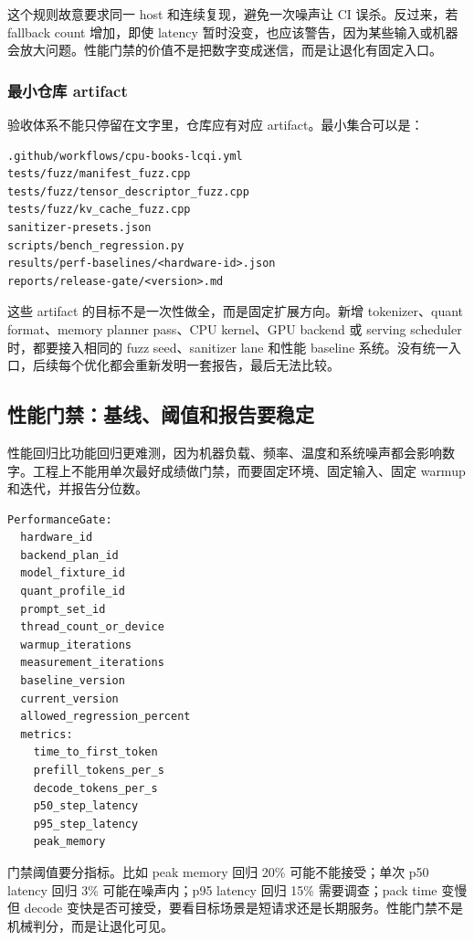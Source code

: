 这个规则故意要求同一 host 和连续复现，避免一次噪声让 CI 误杀。反过来，若 fallback count 增加，即使 latency 暂时没变，也应该警告，因为某些输入或机器会放大问题。性能门禁的价值不是把数字变成迷信，而是让退化有固定入口。

\subsubsection{最小仓库 artifact}

验收体系不能只停留在文字里，仓库应有对应 artifact。最小集合可以是：

\begin{lstlisting}[numbers=none,caption={验收体系最小 artifact}]
.github/workflows/cpu-books-lcqi.yml
tests/fuzz/manifest_fuzz.cpp
tests/fuzz/tensor_descriptor_fuzz.cpp
tests/fuzz/kv_cache_fuzz.cpp
sanitizer-presets.json
scripts/bench_regression.py
results/perf-baselines/<hardware-id>.json
reports/release-gate/<version>.md
\end{lstlisting}

这些 artifact 的目标不是一次性做全，而是固定扩展方向。新增 tokenizer、quant format、memory planner pass、CPU kernel、GPU backend 或 serving scheduler 时，都要接入相同的 fuzz seed、sanitizer lane 和性能 baseline 系统。没有统一入口，后续每个优化都会重新发明一套报告，最后无法比较。

\subsection{性能门禁：基线、阈值和报告要稳定}

性能回归比功能回归更难测，因为机器负载、频率、温度和系统噪声都会影响数字。工程上不能用单次最好成绩做门禁，而要固定环境、固定输入、固定 warmup 和迭代，并报告分位数。

\begin{lstlisting}[numbers=none,caption={性能门禁报告字段}]
PerformanceGate:
  hardware_id
  backend_plan_id
  model_fixture_id
  quant_profile_id
  prompt_set_id
  thread_count_or_device
  warmup_iterations
  measurement_iterations
  baseline_version
  current_version
  allowed_regression_percent
  metrics:
    time_to_first_token
    prefill_tokens_per_s
    decode_tokens_per_s
    p50_step_latency
    p95_step_latency
    peak_memory
\end{lstlisting}

门禁阈值要分指标。比如 peak memory 回归 20\% 可能不能接受；单次 p50 latency 回归 3\% 可能在噪声内；p95 latency 回归 15\% 需要调查；pack time 变慢但 decode 变快是否可接受，要看目标场景是短请求还是长期服务。性能门禁不是机械判分，而是让退化可见。

